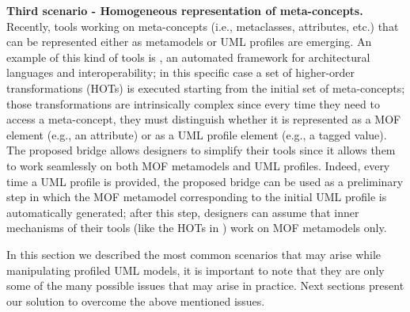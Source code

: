 \textbf{Third scenario - Homogeneous representation of meta-concepts.}
Recently, tools working on meta-concepts (i.e., metaclasses, attributes, etc.) 
that can be represented either as metamodels or UML profiles are emerging. 
An example of this kind of tools is \dually{}, 
an automated framework for architectural languages and interoperability\cite{duallyTSE}; in this specific case a set of higher-order
 transformations (HOTs) is executed starting from the initial set of meta-concepts; those transformations are intrinsically complex since
every time they need to access a meta-concept,
they must distinguish whether it is represented as a MOF element (e.g., an attribute) or as a UML profile element (e.g., a tagged value).
The proposed bridge allows designers to simplify their tools since it allows them to work seamlessly on both MOF metamodels and UML profiles. Indeed, every time a UML profile is provided, the proposed bridge can be used as a preliminary step in which 
the MOF metamodel corresponding to the initial UML profile is automatically generated; 
after this step, designers can assume that inner mechanisms of their tools (like the HOTs in \dually{}) work on MOF metamodels only. 

In this section we described the most common scenarios that may arise while manipulating profiled UML models,
it is important to note that they are only some of the many possible issues that may arise in practice. Next sections present
our solution to overcome the above mentioned issues.
